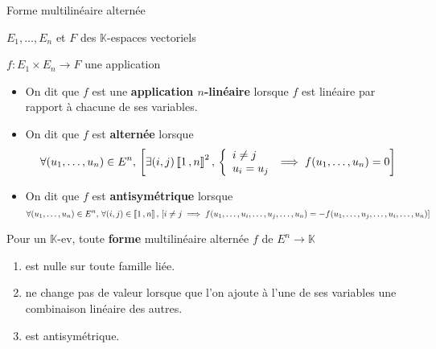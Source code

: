     \begin{defitheo}{Forme multilinéaire alternée}{}
        \begin{soient}
            \item $E_1,\ldots,E_n$ et $F$ des $\mathbb{K}$-espaces vectoriels
            \item $f : E_1 \times E_n \to F$ une application 
        \end{soient}
        \begin{itemize}[label=$\rightarrow$]
            \item On dit que $f$ est une \textbf{application $n$-linéaire} lorsque $f$ est linéaire par rapport à chacune de ses variables.
            \item On dit que $f$ est \textbf{alternée} lorsque  
            \[ \forall (u_1,\ldots,u_n) \in E^n, \, \left[\exists (i,j) \intervalleEntier{1}{n}^2, \, \et{i \neq j}{u_i = u_j} \implies f(u_1,\ldots,u_n) = 0\right] \]
            \item On dit que $f$ est \textbf{antisymétrique} lorsque 
            \[ \forall (u_1,\ldots,u_n) \in E^n, \, \forall (i,j) \in \left\llbracket 1 \, , n \right\rrbracket, \, \left[i \neq j \implies f(u_1, \ldots, u_i, \ldots,u_j, \ldots, u_n) = - f(u_1, \ldots, u_j, \ldots, u_i, \ldots, u_n) \right] \]
        \end{itemize}
        Pour un $\mathbb{K}$-ev, toute \textbf{forme} multilinéaire alternée $f$ de $E^n \to \mathbb{K}$
        \begin{enumerate}
            \item est nulle sur toute famille liée.
            \item ne change pas de valeur lorsque que l’on ajoute à l’une de ses variables une combinaison linéaire des autres.
            \item est antisymétrique.
        \end{enumerate}
    \end{defitheo}

